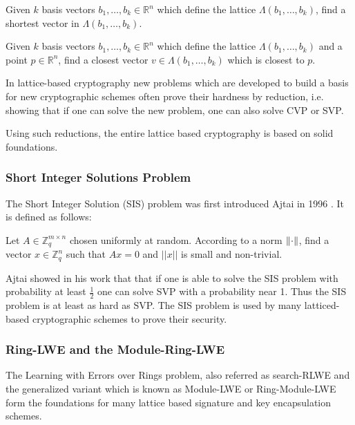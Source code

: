 \begin{definition}
Given $k$ basis vectors $b_1, \ldots, b_k \in \mathds{R}^n$ which define the lattice $Λ(b_1, \ldots, b_k)$, find a shortest vector in $Λ(b_1, \ldots, b_k)$.
\end{definition}

\begin{definition}
Given $k$ basis vectors $b_1, \ldots, b_k \in \mathds{R}^n$ which define the lattice $Λ(b_1, \ldots, b_k)$ and a point $p \in \mathds{R}^n$, find a closest vector $v \in Λ(b_1, \ldots, b_k)$ which is closest to $p$.
\end{definition}

In lattice-based cryptography new problems which are developed to build a basis for new cryptographic schemes often prove their hardness by reduction, i.e. showing that if one can solve the new problem, one can also solve CVP or SVP.

Using such reductions, the entire lattice based cryptography is based on solid foundations.

\subsubsection{Short Integer Solutions Problem}
The Short Integer Solution (SIS) problem was first introduced Ajtai in 1996 \cite{sis}.
It is defined as follows:
\begin{definition}
Let $A \in \mathds{Z}_q^{m \times n}$ chosen uniformly at random. According to a norm $\lVert\cdot\rVert$, find a vector $x \in \mathds{Z}_q^n$ such that $Ax = 0$ and $\lvert \lvert x \rvert \rvert$ is small and non-trivial.
\end{definition}

Ajtai showed in his work \cite{sis}  that that if one is able to solve the SIS problem with probability at least $\frac{1}{2}$ one can solve SVP with a probability near 1. Thus the SIS problem is at least as hard as SVP. The SIS problem is used by many latticed-based cryptographic schemes to prove their security.






\subsubsection{Ring-LWE and the Module-Ring-LWE}
The  Learning with Errors over Rings problem, also referred as search-RLWE and the generalized variant which is known as Module-LWE or Ring-Module-LWE form the foundations for many lattice based signature and key encapsulation schemes.


